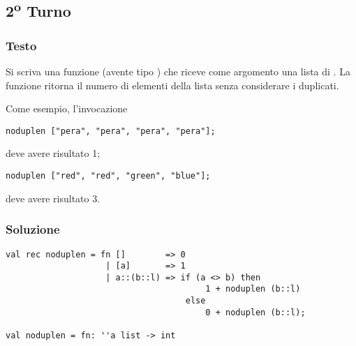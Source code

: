 \subsection{2\textsuperscript{o} Turno}

\subsubsection{Testo}

Si scriva una funzione  (avente tipo ) che riceve come argomento una lista di .
La funzione  ritorna il numero di elementi della lista senza considerare i duplicati.

\medskip
Come esempio, l'invocazione

\begin{lstlisting}
noduplen ["pera", "pera", "pera", "pera"];
\end{lstlisting}

deve avere risultato 1;

\begin{lstlisting}
noduplen ["red", "red", "green", "blue"];
\end{lstlisting}

deve avere risultato 3.

\subsubsection{Soluzione}

\begin{lstlisting}[style = SML, caption = {Definizione della funzione \sml{noduplen}}]
val rec noduplen = fn []		=> 0
					| [a]		=> 1
					| a::(b::l)	=> if (a <> b) then
										1 + noduplen (b::l)
									else
										0 + noduplen (b::l);

val noduplen = fn: ''a list -> int
\end{lstlisting}
